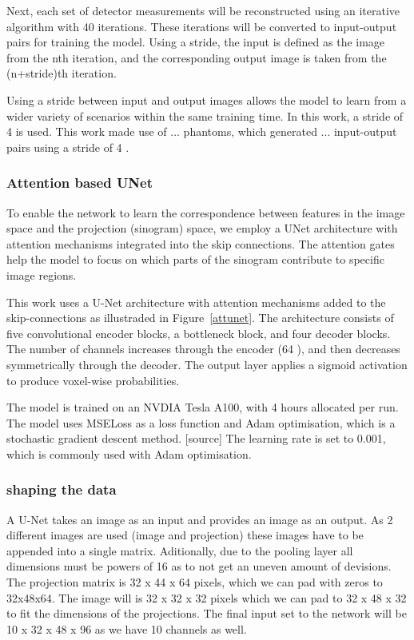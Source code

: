 \documentclass[9pt,Preprint]{lapreprint}
\begin{document}
Next, each set of detector measurements will be reconstructed using an iterative algorithm with 40 iterations. These iterations will be converted to input-output pairs for training the model. Using a stride, the input is defined as the image from the nth iteration, and the corresponding output image is taken from the (n+stride)th iteration.

Using a stride between input and output images allows the model to learn from a wider variety of scenarios within the same training time. In this work, a stride of 4 is used. This work made use of ... phantoms, which generated ... input-output pairs using a stride of 4 .

\subsubsection{Attention based UNet}

To enable the network to learn the correspondence between features in the image space and the projection (sinogram) space, we employ a UNet architecture with attention mechanisms integrated into the skip connections. The attention gates help the model to focus on which parts of the sinogram contribute to specific image regions.

This work uses a U-Net architecture with attention mechanisms added to the skip-connections as illustraded in Figure~\ref{attunet}. The architecture consists of five convolutional encoder blocks, a bottleneck block, and four decoder blocks. The number of channels increases through the encoder (64    ), and then decreases symmetrically through the decoder. The output layer applies a sigmoid activation to produce voxel-wise probabilities.

The model is trained on an NVDIA Tesla A100, with 4 hours allocated per run. The model uses MSELoss as a loss function and Adam optimisation, which is a stochastic gradient descent method. [source] The learning rate is set to 0.001, which is commonly used with Adam optimisation.

\subsubsection{shaping the data}

A U-Net takes an image as an input and provides an image as an output. As 2 different images are used (image and projection) these images have to be appended into a single matrix. Aditionally, due to the pooling layer all dimensions must be powers of 16 as to not get an uneven amount of devisions. The projection matrix is 32 x 44 x 64 pixels, which we can pad with zeros to 32x48x64. The image will is 32 x 32 x 32 pixels which we can pad to 32 x 48 x 32 to fit the dimensions of the projections. The final input set to the network will be 10 x 32 x 48 x 96 as we have 10 channels as well.
\end{document}
